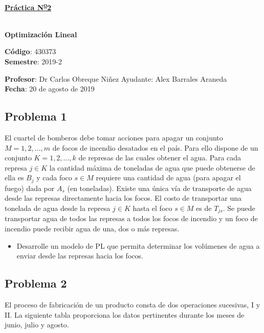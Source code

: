 \documentclass[letterpaper]{article}
\begin{document}
\vspace*{0.5\baselineskip}
\begin{center}
\begin{Large}
\textbf{\underline{Práctica N\textsuperscript{\underline{o}}2}}
\end{Large}\\
\vspace*{0.5\baselineskip}
\textbf{Optimización Lineal} \\
\vspace*{0.5\baselineskip}
\begin{footnotesize}
\textbf{Código}: 430373\\
\textbf{Semestre}: 2019-2
\end{footnotesize}
\end{center}

\noindent \textbf{Profesor}: Dr Carlos Obreque Niñez  \hfill Ayudante: Alex Barrales Araneda\\
\noindent \textbf{Fecha}: 20 de agosto de 2019

\subsection*{Problema 1}
El cuartel de bomberos debe tomar acciones para apagar un conjunto $M = 1,2,\dots,m$ de focos de incendio desatados en el país. Para ello dispone de un conjunto $K = 1,2,\dots,k$ de represas de las cuales obtener el agua. Para cada represa $j \in K$ la cantidad máxima de toneladas de agua que puede obtenerse de ella es $B_j$ y cada foco $s \in M$ requiere una cantidad de agua (para apagar el fuego) dada por $A_s$ (en toneladas). Existe una única vía de transporte de agua desde las represas directamente hacia los focos. El costo de transportar una tonelada de agua desde la represa $j \in K$ hasta el foco $s \in M$ es de $T_{js}$. Se puede transportar agua de todos las represas a todos los focos de incendio y un foco de incendio puede recibir agua de una, dos o más represas.

\begin{itemize}
\item Desarrolle un modelo de PL que permita determinar los volúmenes de agua a enviar desde las represas hacia los focos.
\end{itemize}

\subsection*{Problema 2}
El proceso de fabricación de un producto consta de dos operaciones sucesivas, I y II. La siguiente tabla proporciona los datos pertinentes durante los meses de junio, julio y agosto.
\end{document}
